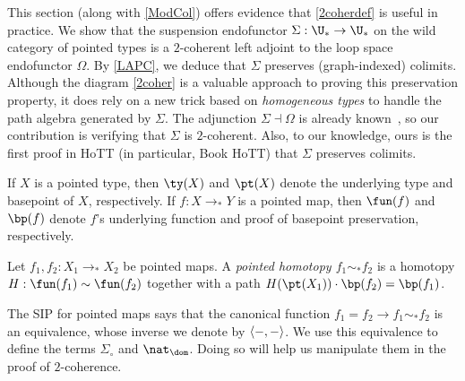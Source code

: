 This section (along with \autoref{ModCol}) offers evidence that \autoref{2coherdef} is useful in practice. We show that the suspension endofunctor $\Sigma : \U_{\ast} \to \U_{\ast}$ on the wild category of pointed types is a $2$-coherent left adjoint to the loop space endofunctor $\Omega$. By \autoref{LAPC}, we deduce that $\Sigma$ preserves (graph-indexed) colimits. Although the diagram \eqref{2coher} is a valuable approach to proving this preservation property, it does rely on a new trick based on \emph{homogeneous types} to handle the path algebra generated by $\Sigma$. The adjunction $\Sigma \dashv \Omega$ is already known~\cite[Lemma 2.16]{Hur}, so our contribution is verifying that $\Sigma$ is $2$-coherent. Also, to our knowledge, ours is the first proof in HoTT (in particular, Book HoTT) that $\Sigma$ preserves colimits.

If $X$ is a pointed type, then $\ty(X)$ and $\pt(X)$ denote the underlying type and basepoint of $X$, respectively. If $f : X \to_{\ast} Y$ is a pointed map, then $\fun(f)$ and $\bp(f)$ denote $f$'s underlying function and proof of basepoint preservation, respectively.
\begin{defi}
Let $f_1, f_2 : X_1 \to_{\ast} X_2$ be pointed maps. A \emph{pointed homotopy $f_1 \sim_{\ast} f_2$} is a homotopy $H : \fun(f_1) \sim \fun(f_2)$ together with a path $ H(\pt(X_1)) \cdot \bp(f_2) = \bp(f_1)$.
\end{defi}
The SIP for pointed maps says that the canonical function $f_1 = f_2 \to f_1 \sim_{\ast} f_2$ is an equivalence, whose  inverse we denote by $\mleft\langle{{-},{-}}\mright\rangle$. We use this equivalence to define the terms $\Sigma_{\circ}$ and $\nat_{\dom}$. Doing so will help us manipulate them in the proof of $2$-coherence. 

